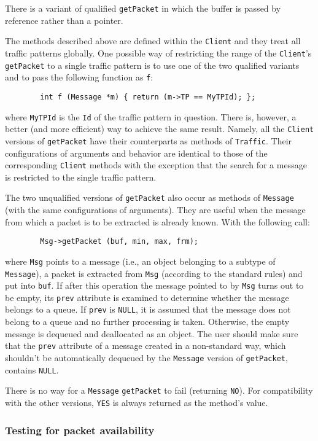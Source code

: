 There is a variant
of qualified {\tt getPacket} in which the buffer is passed by reference rather
than a pointer.

The methods described above are defined within the {\tt Client} and they treat
all traffic patterns globally.
One possible
way of restricting the range of the {\tt Client}'s {\tt getPacket} to a single
traffic pattern is to use one of the two qualified variants and to pass the
following function as {\tt f}:
\begin{verbatim}
        int f (Message *m) { return (m->TP == MyTPId); };
\end{verbatim}
where {\tt MyTPId} is the {\tt Id} of the traffic pattern in question.
There is, however, a better (and more efficient) way to achieve the same
result.
Namely, all the {\tt Client} versions of {\tt getPacket} have their
counterparts as methods of {\tt Traffic}.
Their configurations of arguments and behavior are identical to those of the
corresponding {\tt Client} methods with the exception that the
search for a message is restricted to the single traffic pattern.

The two unqualified versions of {\tt getPacket}
also occur as methods of {\tt Message} (with the same configurations of
arguments).
They are useful when
the message from which a packet is to be extracted is already known.
With the following call:
\begin{verbatim}
        Msg->getPacket (buf, min, max, frm);
\end{verbatim}
where {\tt Msg} points to a message (i.e., an object belonging to a subtype of
{\tt Message}), a packet is extracted from {\tt Msg} (according to the standard
rules) and put into {\tt buf}.
If after this operation the message pointed to by {\tt Msg} turns out to be
empty,
its {\tt prev} attribute is examined to determine whether the message belongs
to a queue.
If {\tt prev} is {\tt NULL}, it is assumed that the message does not belong
to a queue and no further processing is taken.
Otherwise, the empty message is dequeued and deallocated as an object.
The user should make sure that the {\tt prev} attribute of
a message created in a non-standard way,
which shouldn't be automatically dequeued by the {\tt Message} version of
{\tt getPacket}, contains {\tt NULL}.

There is no way for a {\tt Message} {\tt getPacket} to fail
(returning {\tt NO}).
For compatibility with the other versions, {\tt YES} is always returned as the
method's value.

\subsubsection{Testing for packet availability}
\label{rm_cl_in_tp}

